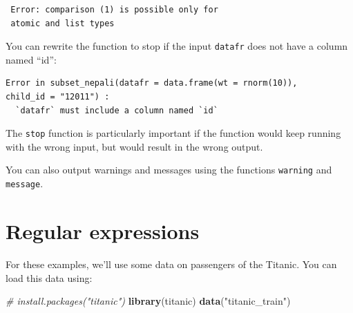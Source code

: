 \documentclass[]{book}
\makeatletter
\newenvironment{Shaded}{\begin{snugshade}}{\end{snugshade}}
\newcommand{\KeywordTok}[1]{\textcolor[rgb]{0.13,0.29,0.53}{\textbf{#1}}}
\newcommand{\DataTypeTok}[1]{\textcolor[rgb]{0.13,0.29,0.53}{#1}}
\newcommand{\DecValTok}[1]{\textcolor[rgb]{0.00,0.00,0.81}{#1}}
\newcommand{\StringTok}[1]{\textcolor[rgb]{0.31,0.60,0.02}{#1}}
\newcommand{\CommentTok}[1]{\textcolor[rgb]{0.56,0.35,0.01}{\textit{#1}}}
\newcommand{\ControlFlowTok}[1]{\textcolor[rgb]{0.13,0.29,0.53}{\textbf{#1}}}
\newcommand{\OperatorTok}[1]{\textcolor[rgb]{0.81,0.36,0.00}{\textbf{#1}}}
\newcommand{\NormalTok}[1]{#1}
\newenvironment{kframe}{%
\medskip{}
\setlength{\fboxsep}{.8em}
 \def\at@end@of@kframe{}%
 \ifinner\ifhmode%
  \def\at@end@of@kframe{\end{minipage}}%
  \begin{minipage}{\columnwidth}%
 \fi\fi%
 \def\FrameCommand##1{\hskip\@totalleftmargin \hskip-\fboxsep
 \colorbox{shadecolor}{##1}\hskip-\fboxsep
     \hskip-\linewidth \hskip-\@totalleftmargin \hskip\columnwidth}%
 \MakeFramed {\advance\hsize-\width
   \@totalleftmargin\z@ \linewidth\hsize
   \@setminipage}}%
 {\par\unskip\endMakeFramed%
 \at@end@of@kframe}
\renewenvironment{Shaded}{\begin{kframe}}{\end{kframe}}
\theoremstyle{definition}
\theoremstyle{definition}
\theoremstyle{definition}
\theoremstyle{remark}
\makeatother
\begin{document}
\begin{verbatim}
 Error: comparison (1) is possible only for 
 atomic and list types 
\end{verbatim}

You can rewrite the function to stop if the input \texttt{datafr} does
not have a column named ``id'':

\begin{Shaded}
\end{Shaded}

\begin{verbatim}
Error in subset_nepali(datafr = data.frame(wt = rnorm(10)),
child_id = "12011") : 
  `datafr` must include a column named `id`
\end{verbatim}

The \texttt{stop} function is particularly important if the function
would keep running with the wrong input, but would result in the wrong
output. \bigskip

You can also output warnings and messages using the functions
\texttt{warning} and \texttt{message}.

\section{Regular expressions}\label{regular-expressions}

For these examples, we'll use some data on passengers of the Titanic.
You can load this data using:

\begin{Shaded}
\begin{Highlighting}[]
\CommentTok{# install.packages("titanic")}
\KeywordTok{library}\NormalTok{(titanic)}
\KeywordTok{data}\NormalTok{(}\StringTok{"titanic_train"}\NormalTok{)}
\end{Highlighting}
\end{Shaded}
\end{document}
